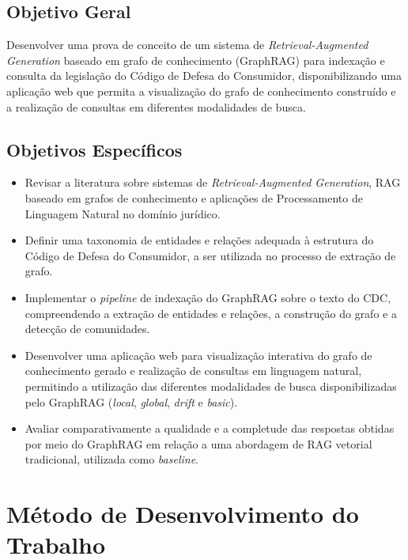 \subsection*{Objetivo Geral}

Desenvolver uma prova de conceito de um sistema de \textit{Retrieval-Augmented
Generation} baseado em grafo de conhecimento (GraphRAG) para indexação e
consulta da legislação do Código de Defesa do Consumidor, disponibilizando uma
aplicação web que permita a visualização do grafo de conhecimento construído e
a realização de consultas em diferentes modalidades de busca.

\subsection*{Objetivos Específicos}

\begin{itemize}
    \item Revisar a literatura sobre sistemas de \textit{Retrieval-Augmented
    Generation}, RAG baseado em grafos de conhecimento e aplicações de
    Processamento de Linguagem Natural no domínio jurídico.

    \item Definir uma taxonomia de entidades e relações adequada à estrutura
    do Código de Defesa do Consumidor, a ser utilizada no processo de extração
    de grafo.

    \item Implementar o \textit{pipeline} de indexação do GraphRAG sobre o
    texto do CDC, compreendendo a extração de entidades e relações, a
    construção do grafo e a detecção de comunidades.

    \item Desenvolver uma aplicação web para visualização interativa do grafo
    de conhecimento gerado e realização de consultas em linguagem natural, permitindo
    a utilização das diferentes modalidades de busca disponibilizadas pelo GraphRAG 
    (\textit{local}, \textit{global}, \textit{drift} e \textit{basic}).

    \item Avaliar comparativamente a qualidade e a completude das respostas
    obtidas por meio do GraphRAG em relação a uma abordagem de RAG vetorial
    tradicional, utilizada como \textit{baseline}.
\end{itemize}

\section{Método de Desenvolvimento do Trabalho}
\label{sec-intro-met}

